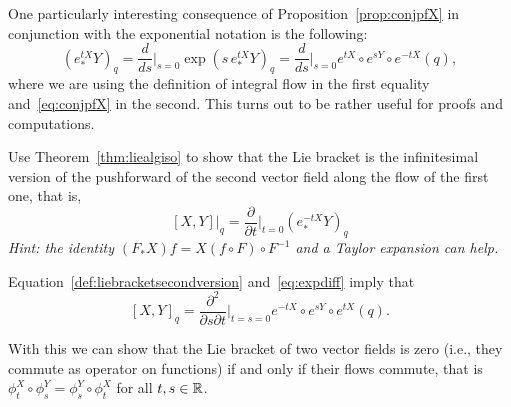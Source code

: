 \begin{remark}
	One particularly interesting consequence of Proposition~\ref{prop:conjpfX} in conjunction with the exponential notation is the following:
	\begin{equation}\label{eq:expdiff}
		\left(e_*^{tX} Y\right)_q =
		\frac{d}{ds}\Big|_{s=0} \exp\left(s\, e_*^{tX} Y\right)_q =
		\frac{d}{ds}\Big|_{s=0} e^{tX}\circ e^{sY}\circ e^{-t X}(q),
	\end{equation}
	where we are using the definition of integral flow in the first equality and~\eqref{eq:conjpfX} in the second.
	This turns out to be rather useful for proofs and computations.
\end{remark}

\begin{exercise}
	Use Theorem~\ref{thm:liealgiso} to show that the Lie bracket is the infinitesimal version of the pushforward of the second vector field along the flow of the first one, that is,
	\begin{equation}\label{def:liebracketsecondversion}
		[X,Y]\big|_q = \frac{\partial}{\partial t}\Big|_{t=0} (e_*^{-t X} Y)_q
	\end{equation}
	\textit{\small Hint: the identity $(F_* X)f = X(f\circ F)\circ F^{-1}$ and a Taylor expansion can help.}
\end{exercise}

\begin{remark}
	Equation~\eqref{def:liebracketsecondversion} and~\eqref{eq:expdiff} imply that
	\begin{equation}\label{eq:lbddr}
		[X,Y]_q = \frac{\partial^2}{\partial s \partial t}\Big|_{t=s=0}e^{-tX}\circ e^{sY}\circ e^{t X}(q).
	\end{equation}
\end{remark}

With this we can show that the Lie bracket of two vector fields is zero (i.e., they commute as operator on functions) if and only if their flows commute, that is $\phi^X_t \circ \phi^Y_s = \phi^Y_s\circ \phi^X_t$ for all $t,s\in\mathbb{R}$.

